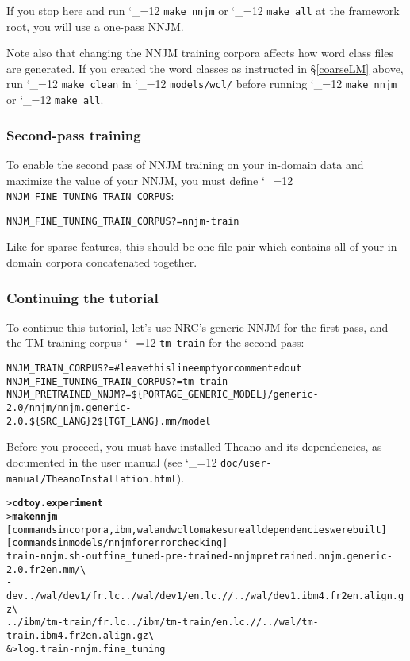 \documentclass[11pt,letterpaper]{article}
\newcommand{\bs}{\textbackslash{}}
\def\code{\begingroup\catcode`\_=12 \codex}
\newcommand{\codex}[1]{\texttt{#1}\endgroup}
\begin{document}
If you stop here and run \code{make nnjm} or \code{make all} at the
framework root, you will use a one-pass NNJM.

Note also that changing the NNJM training corpora affects how word class files are generated.
If you created the word classes as instructed in \S\ref{coarseLM} above, run \code{make clean} in
\code{models/wcl/} before running \code{make nnjm} or \code{make all}.

\subsubsection{Second-pass training}

To enable the second pass of NNJM training on your in-domain data and maximize the value of your NNJM,
you must define \code{NNJM_FINE_TUNING_TRAIN_CORPUS}:
\begin{small}
\begin{alltt}
   NNJM_FINE_TUNING_TRAIN_CORPUS ?= nnjm-train
\end{alltt}
\end{small}
Like for sparse features, this should be one file pair which contains all of
your in-domain corpora concatenated together.

\subsubsection{Continuing the tutorial}

To continue this tutorial, let's use NRC's generic NNJM for the first pass, and
the TM training corpus \code{tm-train} for the second pass:
\begin{small}
\begin{alltt}
   NNJM_TRAIN_CORPUS ?=   # leave this line empty or commented out
   NNJM_FINE_TUNING_TRAIN_CORPUS ?= tm-train
   NNJM_PRETRAINED_NNJM ?= \$\{PORTAGE_GENERIC_MODEL\}/generic-2.0/nnjm/nnjm.generic-
2.0.\$\{SRC_LANG\}2\$\{TGT_LANG\}.mm/model
\end{alltt}
\end{small}

Before you proceed, you must have installed Theano and its dependencies, as
documented in the user manual (see \code{doc/user-manual/TheanoInstallation.html}).

\begin{small}
\begin{alltt}
   > \textbf{cd toy.experiment}
   > \textbf{make nnjm}
   [commands in corpora, ibm, wal and wcl to make sure all dependencies were built]
   [commands in models/nnjm for error checking]
   train-nnjm.sh -out fine_tuned -pre-trained-nnjm pretrained.nnjm.generic-2.0.fr2en.mm/ \bs
      -dev ../wal/dev1/fr.lc ../wal/dev1/en.lc .//../wal/dev1.ibm4.fr2en.align.gz \bs
      ../ibm/tm-train/fr.lc ../ibm/tm-train/en.lc .//../wal/tm-train.ibm4.fr2en.align.gz \bs
      &> log.train-nnjm.fine_tuning
\end{alltt}
\end{small}
\end{document}
